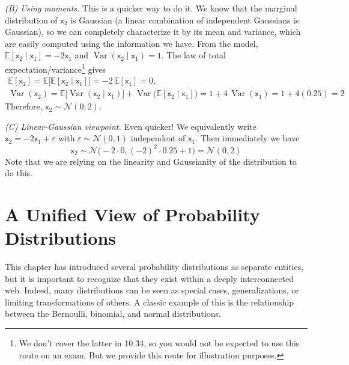 \begin{exampleBox}
    \medskip
    \textit{(B) Using moments.}
    This is a quicker way to do it. We know that the marginal distribution of $\mathsf{x}_2$ is Gaussian (a linear combination of independent Gaussians is Gaussian), so we can completely characterize it by its mean and variance, which are easily computed using the information we have. From the model, $\mathbb{E}[\mathsf{x}_2\mid \mathsf{x}_1]= -2\mathsf{x}_1$ and $\operatorname{Var}(\mathsf{x}_2\mid \mathsf{x}_1)=1$. The law of total expectation/variance\footnote{We don't cover the latter in 10.34, so you would not be expected to use this route on an exam. But we provide this route for illustration purposes.} gives
    \begin{gather}
        \mathbb{E}[\mathsf{x}_2]=\mathbb{E}\!\big[\mathbb{E}[\mathsf{x}_2\mid \mathsf{x}_1]\big]
        =-2\,\mathbb{E}[\mathsf{x}_1]=0, \\
        \operatorname{Var}(\mathsf{x}_2)=\mathbb{E}\!\big[\operatorname{Var}(\mathsf{x}_2\mid \mathsf{x}_1)\big]
        +\operatorname{Var}\!\big(\mathbb{E}[\mathsf{x}_2\mid \mathsf{x}_1]\big)
        =1+4\,\operatorname{Var}(\mathsf{x}_1)=1+4(0.25)=2
    \end{gather}
    Therefore, $\mathsf{x}_2\sim\mathcal{N}(0,2)$.
    
    \medskip
    \textit{(C) Linear-Gaussian viewpoint.} Even quicker! We equivalently write $\mathsf{x}_2=-2\mathsf{x}_1+\varepsilon$ with $\varepsilon\sim\mathcal{N}(0,1)$ independent of $\mathsf{x}_1$. Then immediately we have
    \begin{equation}
        \mathsf{x}_2 \sim \mathcal{N}\!\big(-2\cdot 0,(-2)^2\cdot 0.25 + 1\big)=\mathcal{N}(0,2)
    \end{equation}
    Note that we are relying on the linearity and Gaussianity of the distribution to do this.
\end{exampleBox}

\section{A Unified View of Probability Distributions}

This chapter has introduced several probability distributions as separate entities, but it is important to recognize that they exist within a deeply interconnected web. Indeed, many distributions can be seen as special cases, generalizations, or limiting transformations of others. A classic example of this is the relationship between the Bernoulli, binomial, and normal distributions.

